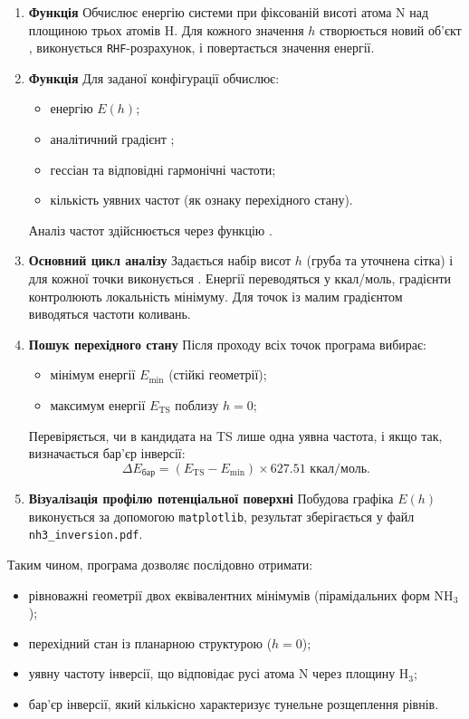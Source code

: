 \begin{enumerate}
    \item \textbf{Функція }
    Обчислює енергію системи при фіксованій висоті атома N над площиною трьох атомів H.
    Для кожного значення $h$ створюється новий об'єкт ,
    виконується \texttt{RHF}-розрахунок, і повертається значення енергії.

    \item \textbf{Функція }
    Для заданої конфігурації обчислює:
    \begin{itemize}
        \item енергію $E(h)$;
        \item аналітичний градієнт ;
        \item гессіан  та відповідні гармонічні частоти;
        \item кількість уявних частот (як ознаку перехідного стану).
    \end{itemize}
    Аналіз частот здійснюється через функцію .

    \item \textbf{Основний цикл аналізу}
    Задається набір висот $h$ (груба та уточнена сітка) і для кожної точки виконується .
    Енергії переводяться у ккал/моль, градієнти контролюють локальність мінімуму.
    Для точок із малим градієнтом виводяться частоти коливань.

    \item \textbf{Пошук перехідного стану}
    Після проходу всіх точок програма вибирає:
    \begin{itemize}
        \item мінімум енергії $E_{\min}$ (стійкі геометрії);
        \item максимум енергії $E_{\text{TS}}$ поблизу $h = 0$;
    \end{itemize}
    Перевіряється, чи в кандидата на TS лише одна уявна частота,
    і якщо так, визначається бар’єр інверсії:
    \[
        \Delta E_{\text{бар}} = (E_{\text{TS}} - E_{\min}) \times 627.51 \text{ ккал/моль}.
    \]

    \item \textbf{Візуалізація профілю потенціальної поверхні}
    Побудова графіка $E(h)$ виконується за допомогою \texttt{matplotlib},
    результат зберігається у файл \texttt{nh3\_inversion.pdf}.
\end{enumerate}

Таким чином, програма дозволяє послідовно отримати:
\begin{itemize}
    \item рівноважні геометрії двох еквівалентних мінімумів (пірамідальних форм NH$_3$);
    \item перехідний стан із планарною структурою ($h = 0$);
    \item уявну частоту інверсії, що відповідає русі атома N через площину H$_3$;
    \item бар’єр інверсії, який кількісно характеризує тунельне розщеплення рівнів.
\end{itemize}